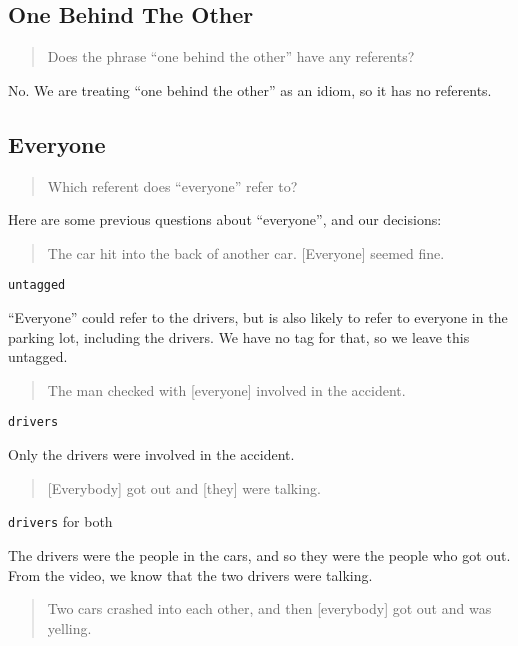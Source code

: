 \documentclass[
]{book}
\begin{document}
\hypertarget{one-behind-the-other}{%
\subsection{One Behind The Other}\label{one-behind-the-other}}

\begin{quote}
Does the phrase ``one behind the other'' have any referents?
\end{quote}

No.
We are treating ``one behind the other'' as an idiom, so it has no referents.

\hypertarget{everyone}{%
\subsection{Everyone}\label{everyone}}

\begin{quote}
Which referent does ``everyone'' refer to?
\end{quote}

Here are some previous questions about ``everyone'', and our decisions:

\begin{quote}
The car hit into the back of another car.
{[}Everyone{]} seemed fine.
\end{quote}

\texttt{untagged}

``Everyone'' could refer to the drivers,
but is also likely to refer to everyone in the parking lot,
including the drivers.
We have no tag for that, so we leave this untagged.

\begin{quote}
The man checked with {[}everyone{]} involved in the accident.
\end{quote}

\texttt{drivers}

Only the drivers were involved in the accident.

\begin{quote}
{[}Everybody{]} got out and {[}they{]} were talking.
\end{quote}

\texttt{drivers} for both

The drivers were the people in the cars,
and so they were the people who got out.
From the video, we know that the two drivers were talking.

\begin{quote}
Two cars crashed into each other,
and then {[}everybody{]} got out and was yelling.
\end{quote}
\end{document}
